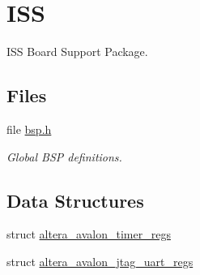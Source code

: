 \hypertarget{group__RTEMSBSPsNios2ISS}{}\section{I\+SS}
\label{group__RTEMSBSPsNios2ISS}


I\+SS Board Support Package.  


\subsection*{Files}
\begin{DoxyCompactItemize}
\item 
file \mbox{\hyperlink{bsps_2nios2_2nios2__iss_2include_2bsp_8h}{bsp.\+h}}
\begin{DoxyCompactList}\small\item\em Global B\+SP definitions. \end{DoxyCompactList}\end{DoxyCompactItemize}
\subsection*{Data Structures}
\begin{DoxyCompactItemize}
\item 
struct \mbox{\hyperlink{structaltera__avalon__timer__regs}{altera\+\_\+avalon\+\_\+timer\+\_\+regs}}
\item 
struct \mbox{\hyperlink{structaltera__avalon__jtag__uart__regs}{altera\+\_\+avalon\+\_\+jtag\+\_\+uart\+\_\+regs}}
\end{DoxyCompactItemize}
